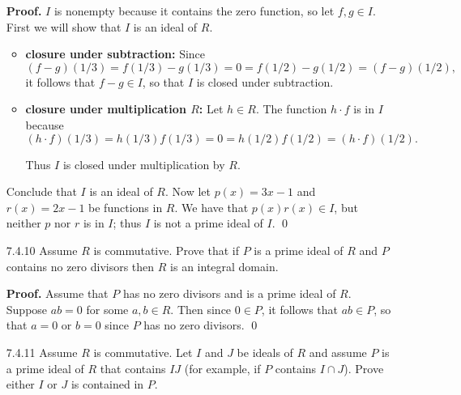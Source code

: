 \begin{enumerate}
      \textbf{Proof.} $I$ is nonempty because it contains the zero function, so
      let $f, g \in I$. First we will show that $I$ is an ideal of $R$.
      
      \begin{itemize}
         \item \textbf{closure under subtraction:} Since
               $$(f - g)(1/3) = f(1/3) - g(1/3) = 0 =
                 f(1/2) - g(1/2) = (f - g)(1/2),$$
               it follows that $f - g \in I$, so that $I$ is closed under
               subtraction.
         \item \textbf{closure under multiplication $R$:} Let $h \in R$. The
               function $h \cdot f$ is in $I$ because
               $$(h\cdot f)(1/3) = h(1/3)f(1/3) = 0 =
                  h(1/2)f(1/2) = (h\cdot f)(1/2).$$
                  
               Thus  $I$ is closed under multiplication by $R$.
      \end{itemize}
     
      Conclude that $I$ is an ideal of $R$. Now let $p(x) = 3x - 1$ and
      $r(x) = 2x - 1$ be functions in $R$. We have that $p(x)r(x) \in I$, but
      neither $p$ nor $r$ is in $I$; thus $I$ is not a prime ideal of $I$. \qed
   \item[7.4.10]  Assume $R$ is commutative. Prove that if $P$ is a prime ideal
                  of $R$ and $P$ contains no zero divisors then $R$ is an
                  integral domain.
                  
      \textbf{Proof.} Assume that $P$ has no zero divisors and is a prime ideal
      of $R$. Suppose $ab = 0$ for some $a, b \in R$. Then since $0 \in P$, it
      follows that $ab \in P$, so that $a = 0$ or $b = 0$ since $P$ has no zero
      divisors. \qed
   \item[7.4.11]  Assume $R$ is commutative. Let $I$ and $J$ be ideals of $R$
                  and assume $P$ is a prime ideal of $R$ that contains $IJ$ (for
                  example, if $P$ contains $I \cap J$). Prove either $I$ or $J$
                  is contained in $P$.
                  

\end{enumerate}
